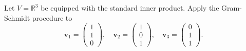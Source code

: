 \begin{example}
    Let $V = \mathbb R^3$ be equipped with the standard inner product. Apply the Gram-Schmidt procedure to
    \[
        \bm v_1 =
        \begin{pmatrix}
            1 \\ 1 \\ 0
        \end{pmatrix}
        , \quad \bm v_2 =
        \begin{pmatrix}
            1 \\ 0 \\ 1
        \end{pmatrix}
        , \quad \bm v_3 =
        \begin{pmatrix}
            0 \\ 1 \\ 1
        \end{pmatrix}
        .
    \]


\end{example}
